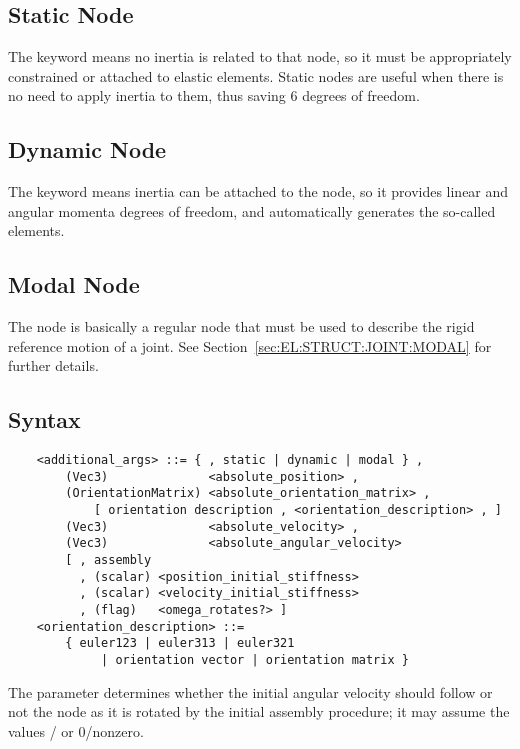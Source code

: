 \subsection{Static Node}
\label{sec:NODE:STRUCTURAL:STATIC}
The  keyword means no inertia is related to that node, 
so it must be appropriately constrained or attached to elastic elements.
Static nodes are useful when there is no need to apply inertia
to them, thus saving 6 degrees of freedom.

\subsection{Dynamic Node}
\label{sec:NODE:STRUCTURAL:DYNAMIC}
The  keyword means inertia can be attached to the node, 
so it provides linear and angular momenta degrees of freedom, 
and automatically generates the so-called 
elements.

\subsection{Modal Node}
\label{sec:NODE:STRUCTURAL:MODAL}
The  node is basically a regular  node
that must be used to describe the rigid reference motion
of a  joint.
See Section~\ref{sec:EL:STRUCT:JOINT:MODAL} for further details.

\subsection{Syntax}
\label{sec:NODE:STRUCTURAL:SYNTAX}
\begin{verbatim}
    <additional_args> ::= { , static | dynamic | modal } ,
        (Vec3)              <absolute_position> ,
        (OrientationMatrix) <absolute_orientation_matrix> ,
            [ orientation description , <orientation_description> , ]
        (Vec3)              <absolute_velocity> ,
        (Vec3)              <absolute_angular_velocity>
        [ , assembly
          , (scalar) <position_initial_stiffness>
          , (scalar) <velocity_initial_stiffness>
          , (flag)   <omega_rotates?> ]
    <orientation_description> ::=
        { euler123 | euler313 | euler321
             | orientation vector | orientation matrix }
\end{verbatim}
The  parameter determines whether 
the initial angular velocity should follow or not the node 
as it is rotated by the initial assembly procedure; it may assume 
the values / or 0/nonzero.

